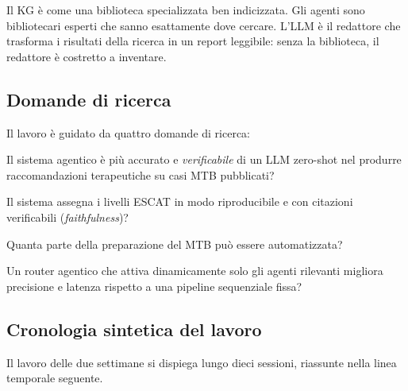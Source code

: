 \documentclass[11pt,a4paper]{article}
\begin{document}
\begin{quotebox}
Il KG \`e come una biblioteca specializzata ben indicizzata. Gli agenti sono bibliotecari esperti che sanno esattamente dove cercare. L'LLM \`e il redattore che trasforma i risultati della ricerca in un report leggibile: senza la biblioteca, il redattore \`e costretto a inventare.
\end{quotebox}

\subsection{Domande di ricerca}
Il lavoro \`e guidato da quattro domande di ricerca:

\begin{defbox}
\begin{description}[leftmargin=3.2em,style=nextline,font=\bfseries\color{primary}]
\item[RQ1] Il sistema agentico \`e pi\`u accurato e \emph{verificabile} di un LLM zero-shot nel produrre raccomandazioni terapeutiche su casi MTB pubblicati?
\item[RQ2] Il sistema assegna i livelli ESCAT in modo riproducibile e con citazioni verificabili (\emph{faithfulness})?
\item[RQ3] Quanta parte della preparazione del MTB pu\`o essere automatizzata?
\item[RQ4] Un router agentico che attiva dinamicamente solo gli agenti rilevanti migliora precisione e latenza rispetto a una pipeline sequenziale fissa?
\end{description}
\end{defbox}

\subsection{Cronologia sintetica del lavoro}
Il lavoro delle due settimane si dispiega lungo dieci sessioni, riassunte nella linea temporale seguente.
\end{document}

